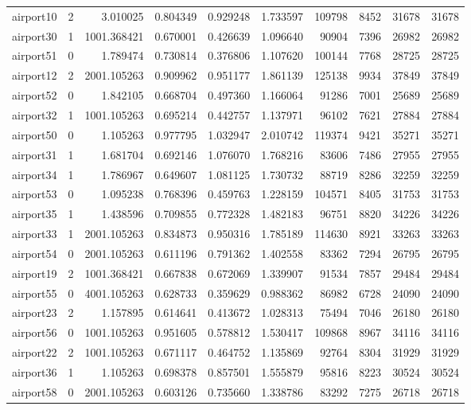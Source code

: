 \documentclass[../../../thesis.tex]{subfiles}
\begin{document}
\begin{longtable}{|l|r|r|r|r|r|r|r|r|r|}
airport10 & 2 & 3.010025 & 0.804349 & 0.929248 & 1.733597 & 109798 & 8452 & 31678 & 31678 \\
airport30 & 1 & 1001.368421 & 0.670001 & 0.426639 & 1.096640 & 90904 & 7396 & 26982 & 26982 \\
airport51 & 0 & 1.789474 & 0.730814 & 0.376806 & 1.107620 & 100144 & 7768 & 28725 & 28725 \\
airport12 & 2 & 2001.105263 & 0.909962 & 0.951177 & 1.861139 & 125138 & 9934 & 37849 & 37849 \\
airport52 & 0 & 1.842105 & 0.668704 & 0.497360 & 1.166064 & 91286 & 7001 & 25689 & 25689 \\
airport32 & 1 & 1001.105263 & 0.695214 & 0.442757 & 1.137971 & 96102 & 7621 & 27884 & 27884 \\
airport50 & 0 & 1.105263 & 0.977795 & 1.032947 & 2.010742 & 119374 & 9421 & 35271 & 35271 \\
airport31 & 1 & 1.681704 & 0.692146 & 1.076070 & 1.768216 & 83606 & 7486 & 27955 & 27955 \\
airport34 & 1 & 1.786967 & 0.649607 & 1.081125 & 1.730732 & 88719 & 8286 & 32259 & 32259 \\
airport53 & 0 & 1.095238 & 0.768396 & 0.459763 & 1.228159 & 104571 & 8405 & 31753 & 31753 \\
airport35 & 1 & 1.438596 & 0.709855 & 0.772328 & 1.482183 & 96751 & 8820 & 34226 & 34226 \\
airport33 & 1 & 2001.105263 & 0.834873 & 0.950316 & 1.785189 & 114630 & 8921 & 33263 & 33263 \\
airport54 & 0 & 2001.105263 & 0.611196 & 0.791362 & 1.402558 & 83362 & 7294 & 26795 & 26795 \\
airport19 & 2 & 1001.368421 & 0.667838 & 0.672069 & 1.339907 & 91534 & 7857 & 29484 & 29484 \\
airport55 & 0 & 4001.105263 & 0.628733 & 0.359629 & 0.988362 & 86982 & 6728 & 24090 & 24090 \\
airport23 & 2 & 1.157895 & 0.614641 & 0.413672 & 1.028313 & 75494 & 7046 & 26180 & 26180 \\
airport56 & 0 & 1001.105263 & 0.951605 & 0.578812 & 1.530417 & 109868 & 8967 & 34116 & 34116 \\
airport22 & 2 & 1001.105263 & 0.671117 & 0.464752 & 1.135869 & 92764 & 8304 & 31929 & 31929 \\
airport36 & 1 & 1.105263 & 0.698378 & 0.857501 & 1.555879 & 95816 & 8223 & 30524 & 30524 \\
airport58 & 0 & 2001.105263 & 0.603126 & 0.735660 & 1.338786 & 83292 & 7275 & 26718 & 26718 \\

\end{longtable}
\end{document}
